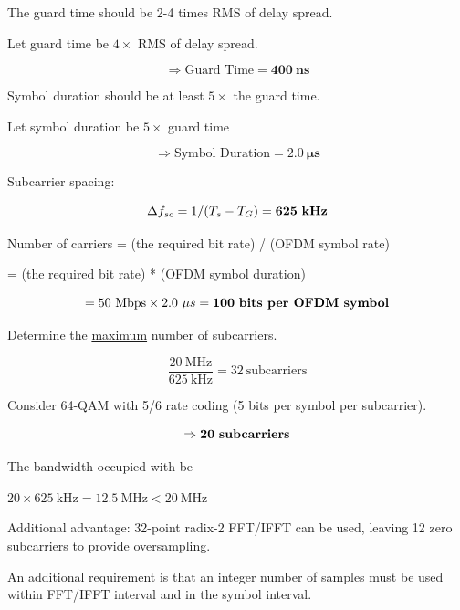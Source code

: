 \documentclass[fleqn]{article}
\begin{document}
\begin{enumerate}
		The guard time should be 2-4 times RMS of delay spread.
		
		Let guard time be $4\times$ RMS of delay spread.
		
		\begin{equation*}
			\Rightarrow \text{Guard Time} = \mathbf{400\ ns}
		\end{equation*}
		
		Symbol duration should be at least $5\times$ the guard time. 
		
		Let symbol duration be $5\times$ guard time
		
		\begin{equation*}
			\Rightarrow \text{Symbol Duration} = \mathbf{2.0\ \mu{s}}
		\end{equation*}
		
		Subcarrier spacing:
		
		\begin{equation*}
			{\Delta}f_{sc} = 1/(T_s - T_G) = \mathbf{625\ \text{\textbf{kHz}}}
		\end{equation*}
		
		Number of carriers = (the required bit rate) / (OFDM symbol rate)
		
		= (the required bit rate) * (OFDM symbol duration)
		 
		\begin{equation*}
			= 50\ \text{Mbps} \times 2.0\ {\mu}s = \mathbf{100\ \text{\textbf{bits per OFDM symbol}}}
		\end{equation*}
		
		Determine the \underline{maximum} number of subcarriers.
		
		\begin{equation*}
			\frac{20\ \text{MHz}}{625\ \text{kHz}} = 32\ \text{subcarriers}
		\end{equation*}
		
		Consider 64-QAM with 5/6 rate coding (5 bits per symbol per subcarrier).
		
		\begin{equation*}
			\Rightarrow \mathbf{20}\ \text{\textbf{subcarriers}}
		\end{equation*}
		
		The bandwidth occupied with be
		
		$20 \times 625\ \text{kHz} = 12.5\ \text{MHz} < 20\ \text{MHz}$
		
		Additional advantage: 32-point radix-2 FFT/IFFT can be used, leaving 12 zero subcarriers to provide oversampling.
		
		An additional requirement is that an integer number of samples must be used within FFT/IFFT interval and in the symbol interval.
		

\end{enumerate}
\end{document}
